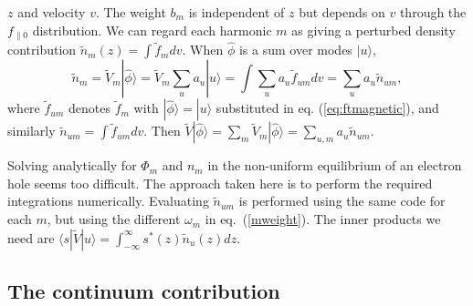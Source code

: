 \documentclass[12pt]{article}
\def\ket#1{|#1\rangle}
\def\bra#1{\langle#1}
\begin{document}
$z$ and velocity $v$. The weight $b_m$ is independent of $z$ but
depends on $v$ through the $f_{\parallel0}$ distribution.
We can regard each harmonic $m$ as giving a
perturbed density contribution $\tilde n_m(z)=\int \tilde f_m
dv$. When $\hat\phi$ is a sum over modes $\ket{u}$,
\begin{equation}
  \label{eq:13}
\tilde  n_m=\tilde{V}_{m}\ket{\hat\phi}=\tilde{V}_{m}\sum_u a_u\ket{u}=\int \sum_u a_u
  \tilde f_{um} dv=\sum_u a_u \tilde n_{um},
\end{equation}
where $\tilde f_{um}$ denotes $\tilde f_m$ with
$\ket{\hat\phi}=\ket{u}$ substituted in eq. (\ref{eq:ftmagnetic}), and
similarly $\tilde n_{um}=\int \tilde f_{um}dv$. Then
$\tilde V \ket{\hat\phi}=\sum_m\tilde
V_m\ket{\hat\phi}=\sum_{u,m}a_u\tilde n_{um}$.

Solving analytically for $\Phi_m$ and $n_m$ in the non-uniform
equilibrium of an electron hole seems too difficult. The approach
taken here is to perform the required integrations numerically.
 Evaluating $\tilde
n_{um}$ is performed using the same code for each $m$, but using the
different $\omega_m$ in eq.\ (\ref{mweight}). The inner products
we need are $\bra{s}|\tilde V\ket{u}=\int_{-\infty}^\infty s^*(z)\tilde
n_{u}(z) dz$.

\subsection{The continuum contribution}
\end{document}
